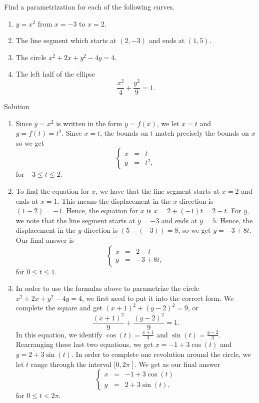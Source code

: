 \begin{example} \label{recttoparametric}  Find a parametrization for each of the following curves.

\begin{enumerate}

\item $y = x^2$ from $x = -3$ to $x = 2$.

\item  The line segment which starts at $(2,-3)$ and ends at $(1,5)$.

\item  The circle $x^2 + 2x + y^2 - 4y = 4$.

\item  The left half of the ellipse 
$$\frac{x^2}{4} + \frac{y^2}{9} = 1.$$

\end{enumerate}

Solution 

\begin{enumerate}

\item  Since $y = x^2$ is written in the form $y = f(x)$, we let $x = t$ and $y = f(t) = t^2$.  Since $x=t$, the bounds on $t$ match precisely the bounds on $x$ so we get 
$$
\left\{\begin{array}{rcl} x & = & t \\[0.2cm] y & = & t^2, \end{array}\right.
$$
for $-3 \leq t \leq 2$.

\item   To find the equation for $x$, we have that the line segment starts at $x= 2$ and ends at $x = 1$.  This means the displacement in the $x$-direction is $(1-2) = -1$.  Hence, the equation for $x$ is $x = 2 + (-1)t = 2-t$.  For $y$, we note that the line segment starts at $y=-3$ and ends at $y=5$.  Hence, the displacement in the $y$-direction is $(5-(-3)) = 8$, so we get $y = -3+8t$.  Our final answer is
$$
\left\{\begin{array}{rcl} x & = & 2-t \\[0.2cm] y & = & -3+8t, \end{array}\right.
$$
for $0 \leq t \leq 1$.

\item In order to use the formulas above to parametrize the circle $x^2 + 2x + y^2 - 4y = 4$, we first need to put it into the correct form.  We complete the square and get $(x+1)^2+(y-2)^2 = 9$, or 
$$\frac{(x+1)^2}{9} + \frac{(y-2)^2}{9} = 1.$$
In this equation, we identify $\cos(t) = \frac{x+1}{3}$ and $\sin(t) = \frac{y-2}{3}$.  Rearranging these last two equations, we get $x = -1+3 \cos(t)$ and $y = 2 +3 \sin(t)$.   In order to complete one revolution around the circle, we let $t$ range through the interval $[0,2\pi\left[\right.$.  We get as our final answer
$$  
\left\{\begin{array}{rcl} x & = & -1+3 \cos(t)\\[0.2cm] y & = & 2 +3 \sin(t), \end{array}\right.
$$
for $0 \leq t < 2\pi$.


\end{enumerate}
\end{example}
